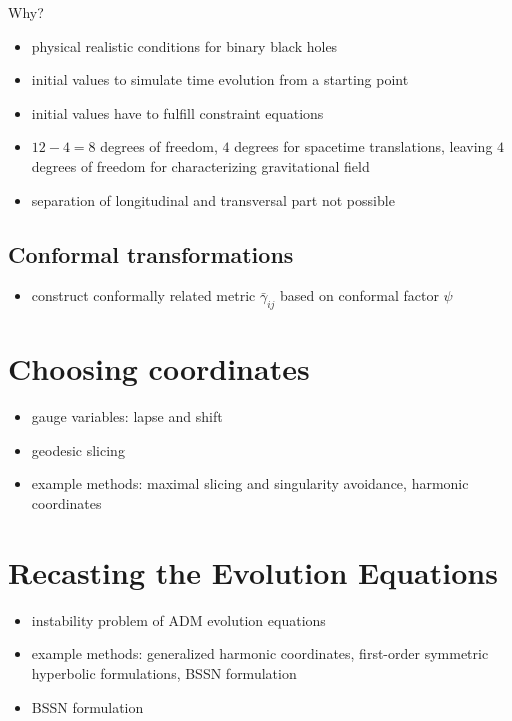 \documentclass[twocolumn]{article}
\begin{document}
    Why?
    \begin{itemize}
      \item physical realistic conditions for binary black holes
    \end{itemize}

    \begin{itemize}
      \item initial values to simulate time evolution from a starting point
      \item initial values have to fulfill constraint equations
      \item $12-4 = 8$ degrees of freedom, $4$ degrees for spacetime translations, leaving $4$ degrees of freedom for characterizing gravitational field
      \item separation of longitudinal and transversal part not possible
    \end{itemize}

    \subsection{Conformal transformations} %
    \label{sub:conformal_transformations}
      \begin{itemize}
        \item construct conformally related metric $\bar{γ}_{ij}$ based on conformal factor $ψ$
      \end{itemize}

  \section{Choosing coordinates} %
  \label{sec:choosing_coordinates}
    \begin{itemize}
      \item gauge variables: lapse and shift
      \item geodesic slicing
      \item example methods: maximal slicing and singularity avoidance, harmonic coordinates
    \end{itemize}

  \section{Recasting the Evolution Equations} %
  \label{sec:recasting_the_evolution_equations}
    \begin{itemize}
      \item instability problem of ADM evolution equations
      \item example methods: generalized harmonic coordinates, first-order symmetric hyperbolic formulations, BSSN formulation
      \item BSSN formulation
    \end{itemize}
\end{document}
